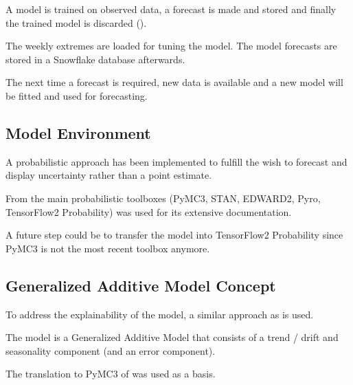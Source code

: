 \documentclass[letterpaper,10pt,english]{sphinxmanual}
\let\sphinxpxdimen\pdfpxdimen\else\newdimen\sphinxpxdimen
\begin{document}
A model is trained on observed data, a forecast is made and stored and finally the trained model is discarded ({\hyperref[\detokenize{autoapi/src/forecast/forecast/index:src.forecast.forecast.forecast}]{}}).

\noindent{\hspace*{\fill}\sphinxincludegraphics[height=250\sphinxpxdimen]{{process_modeling}.png}\hspace*{\fill}}

The weekly extremes are loaded for tuning the model. The model forecasts are stored in a Snowflake database afterwards.

The next time a forecast is required, new data is available and a new model will be fitted and used for forecasting.


\subsection{Model Environment}
\label{\detokenize{modeling:model-environment}}
A probabilistic approach has been implemented to fulfill the wish to forecast and display uncertainty rather than a point estimate.

From the main probabilistic toolboxes (PyMC3, STAN, EDWARD2, Pyro, TensorFlow2 Probability)  was used for its extensive documentation.

A future step could be to transfer the model into TensorFlow2 Probability since PyMC3 is not the most recent toolbox anymore.


\subsection{Generalized Additive Model Concept}
\label{\detokenize{modeling:generalized-additive-model-concept}}
To address the explainability of the model, a similar approach as  is used.

The model is a Generalized Additive Model  that consists of a trend / drift and seasonality component (and an error component).

The translation to PyMC3 of  was used as a basis.
\end{document}
